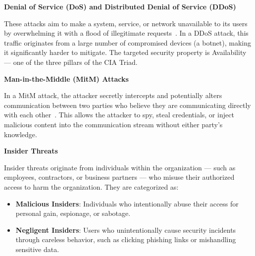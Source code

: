 

\textbf{Denial of Service (DoS) and Distributed Denial of Service (DDoS)}\par
These attacks aim to make a system, service, or network unavailable to its  users by overwhelming it with a flood of illegitimate requests~\cite{paloalto2024dos}. In a DDoS attack, this traffic originates from a large number of compromised devices (a botnet), making it significantly harder to mitigate. The targeted security property is Availability --- one of the three pillars of the CIA Triad.

\vspace{1em}
\textbf{Man-in-the-Middle (MitM) Attacks}\par
In a MitM attack, the attacker secretly intercepts and potentially alters communication between two parties who believe they are communicating directly with each other~\cite{hussain2023mitm,rapid72024mitm}. This allows the attacker to spy, steal credentials, or inject malicious content into the communication stream without either party's knowledge.

\vspace{1em}
\textbf{Insider Threats}\par
Insider threats originate from individuals within the organization --- such as employees, contractors, or business partners --- who misuse their authorized access to harm the organization. They are categorized as:
\begin{itemize}
    \item \textbf{Malicious Insiders}: Individuals who intentionally abuse their access for personal gain, espionage, or sabotage.
    \item \textbf{Negligent Insiders}: Users who unintentionally cause security incidents through careless behavior, such as clicking phishing links or mishandling sensitive data.
\end{itemize}

